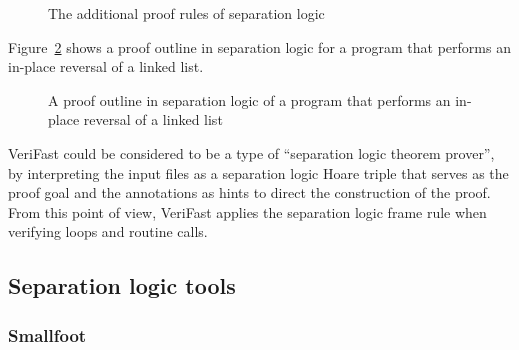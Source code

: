 \documentclass{CSML}
\theoremstyle{definition}\newtheorem{notation}[thm]{Notation}
\theoremstyle{plain}\newtheorem{satz}[thm]{Satz}
\begin{document}
\begin{figure}
\caption{The additional proof rules of separation logic}\label{fig:seplogic}
\end{figure}

 Figure~\ref{fig:reverse-seplogic} shows a proof outline in separation logic for a program that performs an in-place reversal of a linked list.\enlargethispage{\baselineskip}

\begin{figure}

\caption{A proof outline in separation logic of a program that performs an in-place reversal of a linked list}\label{fig:reverse-seplogic}
\end{figure}

VeriFast could be considered to be a type of ``separation logic theorem 
prover'', by interpreting the input files as a separation logic Hoare triple that serves as the proof goal and 
the annotations as hints to direct the construction of the proof. From 
this point of view, VeriFast applies the separation logic frame rule when 
verifying loops and routine calls.

\subsection{Separation logic tools}





\subsubsection{Smallfoot}
\end{document}
